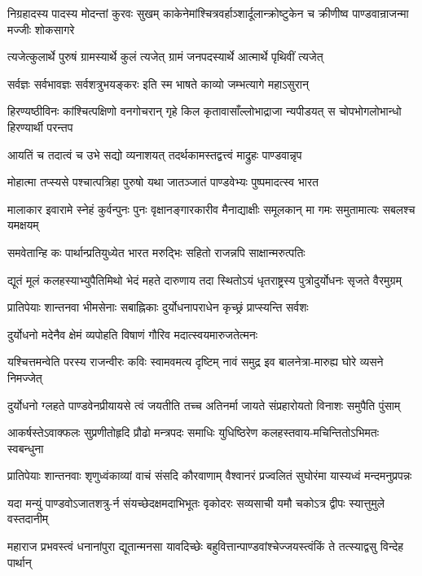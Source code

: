 \threelineshloka
{निग्रहादस्य पादस्य मोदन्तां कुरवः सुखम्}
{काकेनेमांश्चित्रवर्हाञ्शार्दूलान्क्रोष्टुकेन च}
{क्रीणीष्व पाण्डवान्राजन्मा मज्जीः शोकसागरे}


\twolineshloka
{त्यजेत्कुलार्थे पुरुषं ग्रामस्यार्थे कुलं त्यजेत्}
{ग्रामं जनपदस्यार्थे आत्मार्थे पृथिवीं त्यजेत्}


\twolineshloka
{सर्वज्ञः सर्वभावज्ञः सर्वशत्रुभयङ्करः}
{इति स्म भाषते काव्यो जम्भत्यागे महाऽसुरान्}


\threelineshloka
{हिरण्यष्ठीविनः कांश्चित्पक्षिणो वनगोचरान्}
{गृहे किल कृतावासाँल्लोभाद्राजा न्यपीडयत्}
{स चोपभोगलोभान्धो हिरण्यार्थी परन्तप}


\twolineshloka
{आयतिं च तदात्वं च उभे सद्यो व्यनाशयत्}
{तदर्थकामस्तद्वत्त्वं माद्रुहः पाण्डवान्नृप}


\twolineshloka
{मोहात्मा तप्स्यसे पश्चात्पत्रिहा पुरुषो यथा}
{जातञ्जातं पाण्डवेभ्यः पुष्पमादत्स्व भारत}


\threelineshloka
{मालाकार इवारामे स्नेहं कुर्वन्पुनः पुनः}
{वृक्षानङ्गारकारीव मैनाद्याक्षीः समूलकान्}
{मा गमः समुतामात्यः सबलश्च यमक्षयम्}


\twolineshloka
{समवेतान्हि कः पार्थान्प्रतियुध्येत भारत}
{मरुद्भिः सहितो राजन्नपि साक्षान्मरुत्पतिः}


\twolineshloka
{द्यूतं मूलं कलहस्याभ्युपैतिमिथो भेदं महते दारुणाय}
{तदा स्थितोऽयं धृतराष्ट्रस्य पुत्रोदुर्योधनः सृजते वैरमुग्रम्}


\twolineshloka
{प्रातिपेयाः शान्तनवा भीमसेनाः सबाह्निकाः}
{दुर्योधनापराधेन कृच्छ्रं प्राप्स्यन्ति सर्वशः}


\twolineshloka
{दुर्योधनो मदेनैव क्षेमं व्यपोहति}
{विषाणं गौरिव मदात्स्वयमारुजतेत्मनः}


\twolineshloka
{यश्चित्तमन्वेति परस्य राजन्वीरः कविः स्वामवमत्य दृष्टिम्}
{नावं समुद्र इव बालनेत्रा-मारुह्य घोरे व्यसने निमज्जेत्}


\twolineshloka
{दुर्योधनो ग्लहते पाण्डवेनप्रीयायसे त्वं जयतीति तच्च}
{अतिनर्मा जायते संप्रहारोयतो विनाशः समुपैति पुंसाम्}


\twolineshloka
{आकर्षस्तेऽवाक्फलः सुप्रणीतोहृदि प्रौढो मन्त्रपदः समाधिः}
{युधिष्ठिरेण कलहस्तवाय-मचिन्तितोऽभिमतः स्वबन्धुना}


\twolineshloka
{प्रातिपेयाः शान्तनवाः शृणुध्वंकाव्यां वाचं संसदि कौरवाणाम्}
{वैश्वानरं प्रज्वलितं सुघोरंमा यास्यध्वं मन्दमनुप्रपन्नः}


\twolineshloka
{यदा मन्युं पाण्डवोऽजातशत्रु-र्न संयच्छेदक्षमदाभिभूतः}
{वृकोदरः सव्यसाची यमौ चकोऽत्र द्वीपः स्यात्तुमुले वस्तदानीम्}


\twolineshloka
{महाराज प्रभवस्त्वं धनानांपुरा द्यूतान्मनसा यावदिच्छेः}
{बहुवित्तान्पाण्डवांश्चेज्जयस्त्वंकिं ते तत्स्याद्वसु विन्देह पार्थान्}


